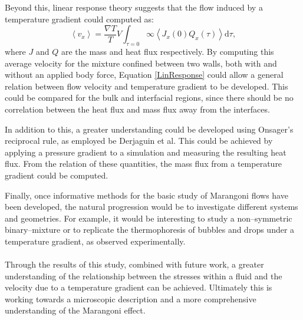 Beyond this, linear response theory suggests that the flow induced by a temperature gradient could computed as:
\begin{equation}
\left< v_{x} \right> = \frac{\nabla T}{T} V \int_{\tau =0}{\infty} \left< J_{x}(0) Q_{x}(\tau) \right> \mathrm{d} \tau,
\label{LinResponse}
\end{equation}
where $J$ and $Q$ are the mass and heat flux respectively.
By computing this average velocity for the mixture confined between two walls, both with and without an applied body force, Equation \ref{LinResponse} could allow a general relation between flow velocity and temperature gradient to be developed.
This could be compared for the bulk and interfacial regions, since there should be no correlation between the heat flux and mass flux away from the interfaces.

In addition to this, a greater understanding could be developed using Onsager's reciprocal rule, as employed be Derjaguin et al.
This could be achieved by applying a pressure gradient to a simulation and measuring the resulting heat flux.
From the relation of these quantities, the mass flux from a temperature gradient could be computed. 

Finally, once informative methods for the basic study of Marangoni flows have been developed, the natural progression would be to investigate different systems and geometries.
For example, it would be interesting to study a non--symmetric binary--mixture or to replicate the thermophoresis of bubbles and drops under a temperature gradient, as observed experimentally.
\\
\\
\indent Through the results of this study, combined with future work, a greater understanding of the relationship between the stresses within a fluid and the velocity due to a temperature gradient can be achieved. 
Ultimately this is working towards a microscopic description and a more comprehensive understanding of the Marangoni effect.
